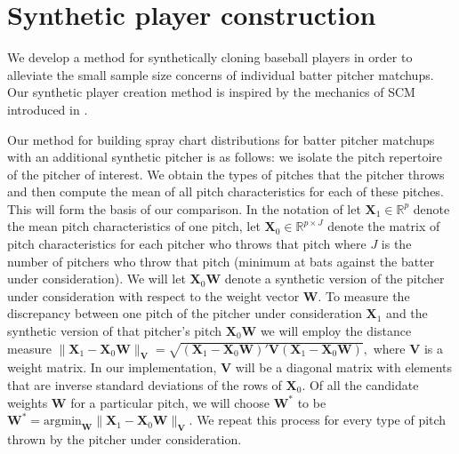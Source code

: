 \documentclass[11pt]{article}
\newcommand{\R}{\mathbb{R}}
\newcommand{\Xbf}{\textbf{X}}
\newcommand{\V}{\textbf{V}}
\newcommand{\W}{\textbf{W}}
\newcommand{\y}{\textbf{y}}
\newcommand{\x}{\textbf{x}}
\newcommand{\h}{\textbf{h}}
\newcommand{\Wstar}{\W^{\textstyle{*}}}
\begin{document}




\section{Synthetic player construction}




We develop a method for synthetically cloning baseball players in order to alleviate the small sample size concerns of individual batter pitcher matchups. Our synthetic player creation method is inspired by the mechanics of SCM introduced in \cite{abadie2010synthetic}. 

Our method for building spray chart distributions for batter pitcher matchups with an additional  synthetic pitcher is as follows: we isolate the pitch repertoire of the pitcher of interest. We obtain the types of pitches that the pitcher throws and then compute the mean of all pitch characteristics for each of these pitches. This will form the basis of our comparison. In the notation of \cite{abadie2010synthetic} let $\Xbf_1 \in \R^p$ denote the mean pitch characteristics of one pitch, let $\Xbf_0 \in \R^{p \times J}$ denote the matrix of pitch characteristics for each pitcher who throws that pitch where $J$ is the number of pitchers who throw that pitch (minimum at bats against the batter under consideration). We will let $\Xbf_0\W$ denote a synthetic version of the pitcher under consideration with respect to the weight vector $\W$. To measure the discrepancy between one pitch of the pitcher under consideration $\Xbf_1$ and the synthetic version of that pitcher's pitch $\Xbf_0\W$ we will employ the distance measure
$ 
 \|\Xbf_1 - \Xbf_0\W\|_\V = \sqrt{(\Xbf_1 - \Xbf_0\W)'\V(\Xbf_1 - \Xbf_0\W)},
$
where $\V$ is a weight matrix. In our implementation, $\V$ will be a diagonal matrix with elements that are inverse standard deviations of the rows of $\Xbf_0$. Of all the candidate weights $\W$ for a particular pitch, we will choose $\Wstar$ to be 
$
  \Wstar = \text{argmin}_\W \|\Xbf_1 - \Xbf_0\W\|_\V.
$
We repeat this process for every type of pitch thrown by the pitcher under consideration.
\end{document}
